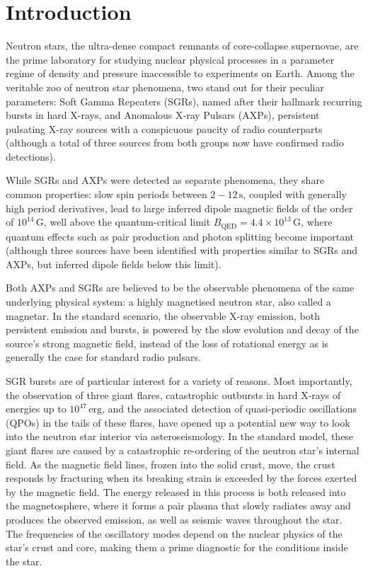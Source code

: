 \documentclass[12pt]{emulateapj}
\begin{document}
\section{Introduction}

Neutron stars, the ultra-dense compact remnants of core-collapse supernovae, are the prime laboratory for studying nuclear 
physical processes in a parameter regime of density and pressure inaccessible to experiments on Earth. 
Among the veritable zoo of neutron star phenomena, two stand out for their peculiar parameters: Soft Gamma Repeaters (SGRs),
named after their hallmark recurring bursts in hard X-rays, and Anomalous X-ray Pulsars (AXPs), persistent pulsating X-ray
sources with a conspicuous paucity of radio counterparts (although a total of three sources from both groups now
have confirmed radio detections). 

While SGRs and AXPs were detected as separate phenomena, they share common properties: slow spin periods between
$2 - 12 \, \mathrm{s}$, coupled with generally high period derivatives, lead to large inferred dipole magnetic fields of
the order of $10^{14} \, \mathrm{G}$, well above the quantum-critical limit $B_{\mathrm{QED}} = 4.4 \times 10^{13} \, \mathrm{G}$,
where quantum effects such as pair production and photon splitting become important (although three sources have been 
identified with properties similar to SGRs and AXPs, but inferred dipole fields below this limit). 

Both AXPs and SGRs are believed to be the observable phenomena of the same underlying physical system: a highly magnetised
neutron star, also called a magnetar. In the standard scenario, the observable X-ray emission, both persistent emission and bursts, 
is powered by the slow evolution and decay of the source's strong magnetic field, instead of the loss of rotational energy as 
is generally the case for standard radio pulsars. 

SGR bursts are of particular interest for a variety of reasons. Most importantly, the observation of three giant flares, catastrophic
outbursts in hard X-rays of energies up to $10^{47} \, \mathrm{erg}$, and the associated detection of quasi-periodic oscillations (QPOs)
in the tails of these flares, have opened up a potential new way to look into the neutron star interior via asteroseismology. In the standard 
model, these giant flares are caused by a catastrophic re-ordering of the neutron star's internal field. As the magnetic field lines, frozen into
the solid crust, move, the crust responds by fracturing when its breaking strain is exceeded by the forces exerted by the magnetic field.
The energy released in this process is both released into the magnetosphere, where it forms a pair plasma that slowly radiates away and
produces the observed emission, as well as seismic waves throughout the star. The frequencies of the oscillatory modes depend on
the nuclear physics of the star's crust and core, making them a prime diagnostic for the conditions inside the star.
\end{document}
